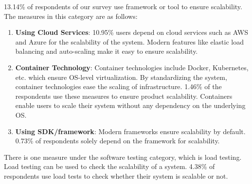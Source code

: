  13.14\% of respondents of our survey use framework or tool to ensure scalability. The measures in this category are as follows:
\begin{enumerate}[label=(\alph*)]

    \item \textbf{Using Cloud Services}: 10.95\% users depend on cloud services such as AWS and Azure for the scalability of the system. Modern features like elastic load balancing and auto-scaling make it easy to ensure scalability.
    
    \item \textbf{Container Technology}: Container technologies include Docker, Kubernetes, etc. which ensure OS-level virtualization. By standardizing the system, container technologies ease the scaling of infrastructure. 1.46\% of the respondents use these measures to ensure product scalability. Containers enable users to scale their system without any dependency on the underlying OS.
    
    \item \textbf{Using SDK/framework}: Modern frameworks ensure scalability by default. 0.73\% of respondents solely depend on the framework for scalability.
  
\end{enumerate}
 
 
There is one measure under the software testing category, which is load testing. Load testing can be used to check the scalability of a system. 4.38\% of respondents use load tests to check whether their system is scalable or not.

